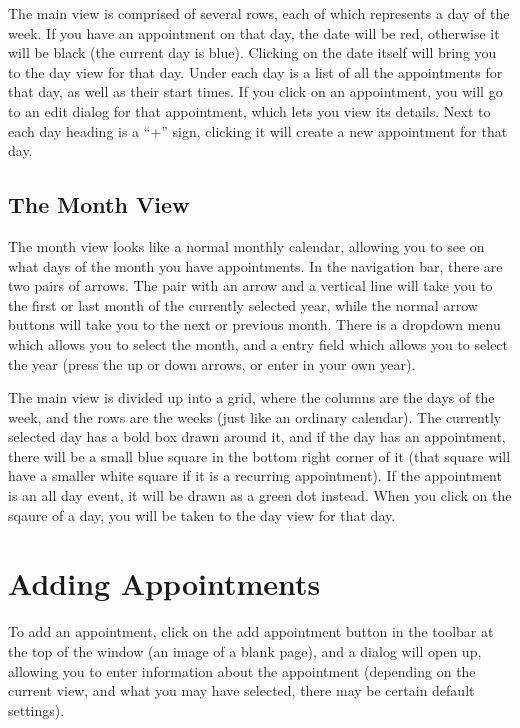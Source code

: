 \documentclass[12pt,letterpaper,oneside, openany]{book} \usepackage[latin1] {inputenc}
\begin{document}
The main view is comprised of several rows, each of which represents a day of the week. If you have an appointment on that day, the date will be red, otherwise it will be black (the current day is blue). Clicking on the date itself will bring you to the day view for that day. Under each day is a list of all the appointments for that day, as well as their start times. If you click on an appointment, you will go to an edit dialog for that appointment, which lets you view its details. Next to each day heading is a ``+'' sign, clicking it will create a new appointment for that day. 

\subsection{The Month View}

The month view looks like a normal monthly calendar, allowing you to see on what days of the month you have appointments. In the navigation bar, there are two pairs of arrows. The pair with an arrow and a vertical line will take you to the first or last month of the currently selected year, while the normal arrow buttons will take you to the next or previous month. There is a dropdown menu which allows you to select the month, and a entry field which allows you to select the year (press the up or down arrows, or enter in your own year). 

The main view is divided up into a grid, where the columns are the days of the week, and the rows are the weeks (just like an ordinary calendar). The currently selected day has a bold box drawn around it, and if the day has an appointment, there will be a small blue square in the bottom right corner of it (that square will have a smaller white square if it is a recurring appointment). If the appointment is an all day event, it will be drawn as a green dot instead. When you click on the sqaure of a day, you will be taken to the day view for that day. 

\section{Adding Appointments}

To add an appointment, click on the add appointment button in the toolbar at the top of the window (an image of a blank page), and a dialog will open up, allowing you to enter information about the appointment (depending on the current view, and what you may have selected, there may be certain default settings). 
\end{document}
